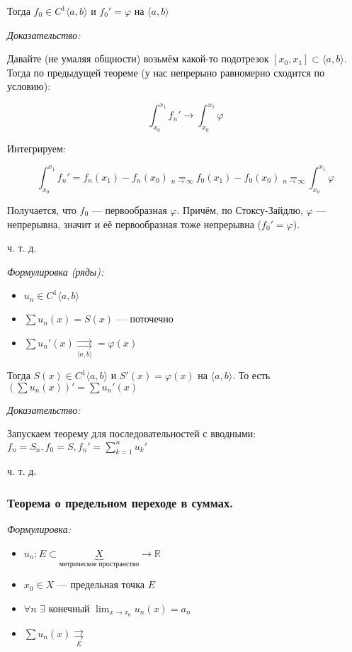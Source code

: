 \documentclass{article}
\def\dbl{\,\,}
\def\rsh#1{\underset{#1}{\rightrightarrows}}
\def\rshe{\rsh{E}}
\begin{document}
Тогда $f_0 \in C^1\langle a, b \rangle$ и $f_0' = \varphi$ на $\langle a, b \rangle$

\textit{Доказательство:}

Давайте (не умаляя общности) возьмём какой-то подотрезок $[x_0, x_1] \subset \langle a, b \rangle$. Тогда по предыдущей теореме (у нас непрерыно равномерно сходится по условию):

\[\int_{x_0}^{x_1} f_n' \longrightarrow \int_{x_0}^{x_1} \varphi \]

Интегрируем:

\[\int_{x_0}^{x_1} f_n' = f_n(x_1) - f_n(x_0) \underset{n \rightarrow \infty}{=} f_0(x_1) - f_0(x_0) \underset{n \rightarrow \infty}{=} \int_{x_0}^{x_1} \varphi \]

Получается, что $f_0$ --- первообразная $\varphi$. Причём, по Стоксу-Зайдлю, $\varphi$ --- непрерывна, значит и её первообразная тоже непрерывна ($f_0' = \varphi$).

ч. т. д. 

\textit{Формулировка (ряды):}

\begin{itemize}
    \item $u_n \in C^1\langle a, b \rangle$
    \item $\sum u_n(x) = S(x)$ --- поточечно
    \item $\sum u_n'(x) \rsh{\langle a, b \rangle} = \varphi(x)$
\end{itemize}

Тогда $S(x) \in C^1\langle a, b \rangle$ и $S'(x) = \varphi (x)$ на $\langle a, b \rangle$. То есть $\left(\sum u_n(x)\right)' = \sum u_n'(x)$

\textit{Доказательство:}

Запускаем теорему для последовательностей с вводными: $f_n = S_n, f_0 = S, f_n' = \sum_{k = 1}^n u_k'$

ч. т. д.

\subsubsection{Теорема о предельном переходе в суммах.}
\textit{Формулировка:}

\begin{itemize}
    \item $u_n: E \subset \underbrace{X}_{\text{метрическое пространство}} \rightarrow \mathbb{R}$
    \item $x_0 \in X$ --- предельная точка $E$
    \item $\forall n \dbl \exists$ конечный $\lim_{x \rightarrow x_0} u_n(x) = a_n$
    \item $\sum u_n(x) \rshe$
\end{itemize}
\end{document}
